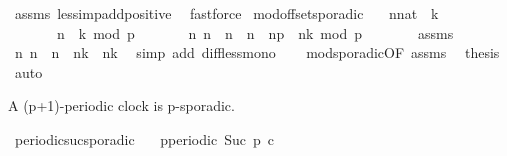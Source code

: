 \begin{isabellebody}
%
\isadelimproof
%
\endisadelimproof
%
\isatagproof
{}\isamarkupfalse%
\ assms\ less{\isacharunderscore}imp{\isacharunderscore}add{\isacharunderscore}positive\ \isamarkupfalse%
\ fastforce%
\endisatagproof
{\isafoldproof}%
%
\isadelimproof
\isanewline
%
\endisadelimproof
\isanewline
{}\isamarkupfalse%
\ mod{\isacharunderscore}offset{\isacharunderscore}sporadic{\isacharcolon}\isanewline
\ \ \ {\isacartoucheopen}{\isacharparenleft}n{\isacharcolon}{\isacharcolon}nat{\isacharparenright}\ {\isasymge}\ k{\isacartoucheclose}\isanewline
\ \ \ \ \ \ \ {\isacartoucheopen}{\isacharparenleft}n\ {\isacharminus}\ k{\isacharparenright}\ mod\ p\ {\isacharequal}\ {}{\isacartoucheclose}\isanewline
\ \ \ \ \ {\isacartoucheopen}{\isasymforall}n{\isacharprime}{\isachardot}\ {\isacharparenleft}n\ {\isacharless}\ n{\isacharprime}\ {\isasymand}\ n{\isacharprime}\ {\isacharless}\ n{\isacharplus}p{\isacharparenright}\ {\isasymlongrightarrow}\ {\isasymnot}{\isacharparenleft}{\isacharparenleft}n{\isacharprime}{\isacharminus}k{\isacharparenright}\ mod\ p\ {\isacharequal}\ {}{\isacharparenright}{\isacartoucheclose}\isanewline
%
\isadelimproof
%
\endisadelimproof
%
\isatagproof
{}\isamarkupfalse%
\ {\isacharminus}\isanewline
\ \ \isamarkupfalse%
\ assms\ \isamarkupfalse%
\ {\isacartoucheopen}{\isasymforall}n{\isacharprime}{\isachardot}\ n{\isacharprime}\ {\isachargreater}\ n\ {\isasymlongrightarrow}\ {\isacharparenleft}n{\isacharprime}{\isacharminus}k{\isacharparenright}\ {\isachargreater}\ {\isacharparenleft}n{\isacharminus}k{\isacharparenright}{\isacartoucheclose}\ \isamarkupfalse%
\ {\isacharparenleft}simp\ add{\isacharcolon}\ diff{\isacharunderscore}less{\isacharunderscore}mono{\isacharparenright}\isanewline
\ \ \isamarkupfalse%
\ mod{\isacharunderscore}sporadic{\isacharbrackleft}OF\ assms{\isacharparenleft}{}{\isacharparenright}{\isacharbrackright}\ \isamarkupfalse%
\ {\isacharquery}thesis\ \isamarkupfalse%
\ auto\isanewline
{}\isamarkupfalse%
%
\endisatagproof
{\isafoldproof}%
%
\isadelimproof
%
\endisadelimproof
%
\begin{isamarkuptext}%
A (p+1)-periodic clock is p-sporadic.%
\end{isamarkuptext}\isamarkuptrue%
\isamarkupfalse%
\ periodic{\isacharunderscore}suc{\isacharunderscore}sporadic{\isacharcolon}\isanewline
\ \ \ {\isacartoucheopen}p{\isacharunderscore}periodic\ {\isacharparenleft}Suc\ p{\isacharparenright}\ c{\isacartoucheclose}\isanewline

\end{isabellebody}
